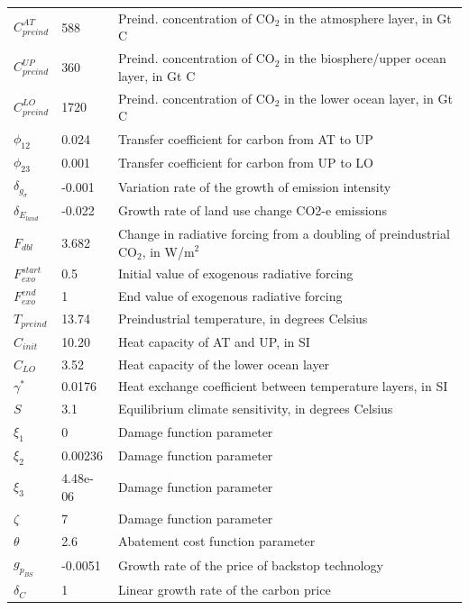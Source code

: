 \documentclass{article}[12 pt]
\begin{document}
\begin{tabular}{ l l l }
$C^{AT}_{preind}$ & 588 & Preind. concentration of CO$_2$ in the atmosphere layer, in Gt C \\
$C^{UP}_{preind}$  & 360 & Preind. concentration of CO$_2$ in the biosphere/upper ocean layer, in Gt C \\
$C^{LO}_{preind}$ & 1720 & Preind. concentration of CO$_2$ in the lower ocean layer, in Gt C   \\
$\phi_{12}$  & 0.024 & Transfer coefficient for carbon from AT to UP\\
$\phi_{23}$ & 0.001 & Transfer coefficient for carbon from UP to LO\\
$\delta_{g_{\sigma}}$  & -0.001 & Variation rate of the growth of emission intensity \\
$\delta_{E_{land}}$ & -0.022 & Growth rate of land use change CO2-e emissions  \\
$F_{dbl}$ & 3.682 & Change in radiative forcing from a doubling of preindustrial CO$_2$, in W/m$^2$  \\
$F_{exo}^{start}$ & 0.5 & Initial value of exogenous radiative forcing \\
$F_{exo}^{end}$ & 1 & End value of exogenous radiative forcing \\
$T_{preind}$ & 13.74 & Preindustrial temperature, in degrees Celsius \\
$C_{init}$ & 10.20 & Heat capacity of AT and UP, in SI \\
$C_{LO}$ & 3.52 & Heat capacity of the lower ocean layer \\
$\gamma^*$ & 0.0176 & Heat exchange coefficient between temperature layers, in SI \\
$S$ & 3.1 & Equilibrium climate sensitivity, in degrees Celsius \\
$\xi_1$ & 0 & Damage function parameter \\
$\xi_2$ & 0.00236 & Damage function parameter  \\
$\xi_3$ & 4.48e-06 & Damage function parameter \\
$\zeta$ & 7 & Damage function parameter \\
$\theta$ & 2.6 & Abatement cost function parameter \\
$g_{p_{BS}}$ & -0.0051 & Growth rate of the price of backstop technology \\
$\delta_C$ & 1 & Linear growth rate of the carbon price \\
\hline
\end{tabular}


\newpage 
\end{document}
